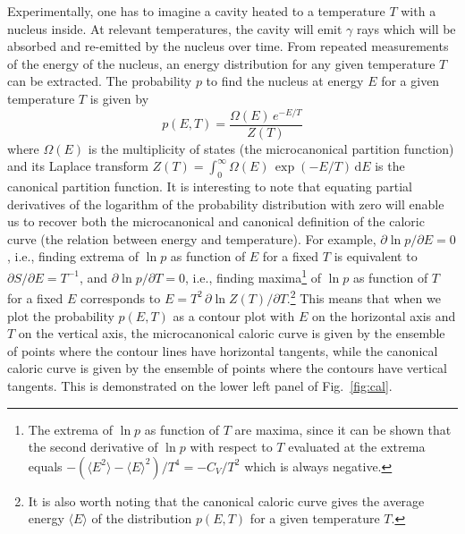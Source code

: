 \documentclass[sort&compress,final,numberedheadings]{aipproc}
\begin{document}
Experimentally, one has to imagine a cavity heated to a temperature $T$ with a 
nucleus inside. At relevant temperatures, the cavity will emit $\gamma$ rays 
which will be absorbed and re-emitted by the nucleus over time. From repeated
measurements of the energy of the nucleus, an energy distribution for any given
temperature $T$ can be extracted. The probability $p$ to find the nucleus at 
energy $E$ for a given temperature $T$ is given by
\begin{equation}
p(E,T)=\frac{\Omega(E)\,e^{-E/T}}{Z(T)}
\end{equation}
where $\Omega(E)$ is the multiplicity of states (the microcanonical partition 
function) and its Laplace transform 
$Z(T)=\int_0^\infty\Omega(E)\,\exp(-E/T)\,{\mathrm{d}}E$ is the canonical 
partition function. It is interesting to note that equating partial derivatives
of the logarithm of the probability distribution with zero will enable us to 
recover both the microcanonical and canonical definition of the caloric curve 
(the relation between energy and temperature). For example, 
$\partial\ln p/\partial E=0$, i.e., finding extrema of $\ln p$ as function of 
$E$ for a fixed $T$ is equivalent to $\partial S/\partial E=T^{-1}$, and 
$\partial\ln p/\partial T=0$, i.e., finding maxima\footnote{The extrema of 
$\ln p$ as function of $T$ are maxima, since it can be shown that the second
derivative of $\ln p$ with respect to $T$ evaluated at the extrema equals 
$-(\langle E^2\rangle-\langle E\rangle^2)/T^4=-C_V/T^2$ which is always 
negative.} of $\ln p$ as function of $T$ for a fixed $E$ corresponds to 
$E=T^2\,\partial\ln Z(T)/\partial T$.\footnote{It is also worth noting that the
canonical caloric curve gives the average energy $\langle E\rangle$ of the 
distribution $p(E,T)$ for a given temperature $T$.} This means that when we 
plot the probability $p(E,T)$ as a contour plot with $E$ on the horizontal axis
and $T$ on the vertical axis, the microcanonical caloric curve is given by the 
ensemble of points where the contour lines have horizontal tangents, while the 
canonical caloric curve is given by the ensemble of points where the contours 
have vertical tangents. This is demonstrated on the lower left panel of Fig.\ 
\ref{fig:cal}.
\end{document}
